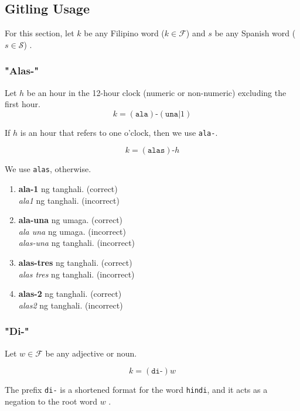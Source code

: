 \subsection{Gitling Usage}
\label{gitling_usage}
For this section, let $k$ be any Filipino word (\(k\in\mathcal{F}\)) and $s$ be any Spanish word (\(s\in\mathcal{S}\)) \cite{Balarila}.

\subsubsection{"Alas-"}

Let \(h\) be an hour in the 12-hour clock (numeric or non-numeric) excluding the first hour.
\[
      k = (\texttt{ala})\texttt{-}(\texttt{una} | 1)
\]

If $h$ is an hour that refers to one o'clock, then we use \texttt{ala-}.

\[
      k = (\texttt{alas})\texttt{-}h
\]

We use \texttt{alas}, otherwise.

\begin{example}
\end{example}
\begin{enumerate}
      \item \textbf{ala-1} ng tanghali. (correct) \\
            \textit{ala1} ng tanghali. (incorrect)
      \item \textbf{ala-una} ng umaga. (correct) \\
            \textit{ala una} ng umaga. (incorrect) \\
            \textit{alas-una} ng tanghali. (incorrect)
      \item \textbf{alas-tres} ng tanghali. (correct) \\
            \textit{alas tres} ng tanghali. (incorrect)
      \item \textbf{alas-2} ng tanghali. (correct) \\
            \textit{alas2} ng tanghali. (incorrect)
\end{enumerate}

\subsubsection{"Di-"}

Let $w\in\mathcal{F}$ be any adjective or noun.

\[
      k = (\texttt{di-})w
\]

The prefix \texttt{di-} is a shortened format for the word \texttt{hindi}, and it acts as a negation to the root word $w$ \cite{Balarila}.

